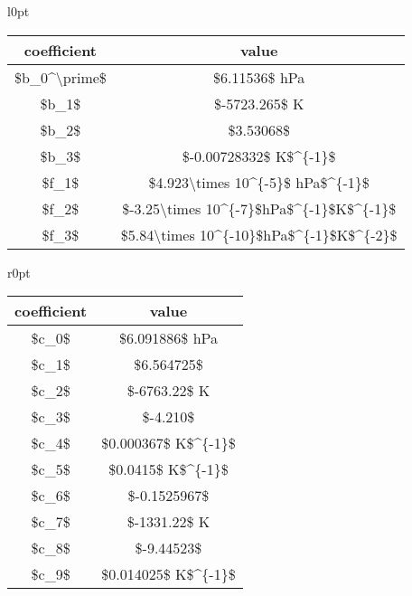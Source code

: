 \documentclass[
  english,
]{book}
\begin{document}
\begin{table}
\begin{wraptable}{l}{0pt}
\begin{tabular}[c]{c|c}
\hline
coefficient & value\\
\hline
\$b\_0\textasciicircum{}\textbackslash{}prime\$ & \$6.11536\$ hPa\\
\hline
\$b\_1\$ & \$-5723.265\$ K\\
\hline
\$b\_2\$ & \$3.53068\$\\
\hline
\$b\_3\$ & \$-0.00728332\$ K\$\textasciicircum{}\{-1\}\$\\
\hline
\$f\_1\$ & \$4.923\textbackslash{}times 10\textasciicircum{}\{-5\}\$ hPa\$\textasciicircum{}\{-1\}\$\\
\hline
\$f\_2\$ & \$-3.25\textbackslash{}times 10\textasciicircum{}\{-7\}\$hPa\$\textasciicircum{}\{-1\}\$K\$\textasciicircum{}\{-1\}\$\\
\hline
\$f\_3\$ & \$5.84\textbackslash{}times 10\textasciicircum{}\{-10\}\$hPa\$\textasciicircum{}\{-1\}\$K\$\textasciicircum{}\{-2\}\$\\
\hline
\end{tabular}\end{wraptable}\begin{wraptable}{r}{0pt}
\begin{tabular}[c]{c|c}
\hline
coefficient & value\\
\hline
\$c\_0\$ & \$6.091886\$ hPa\\
\hline
\$c\_1\$ & \$6.564725\$\\
\hline
\$c\_2\$ & \$-6763.22\$ K\\
\hline
\$c\_3\$ & \$-4.210\$\\
\hline
\$c\_4\$ & \$0.000367\$ K\$\textasciicircum{}\{-1\}\$\\
\hline
\$c\_5\$ & \$0.0415\$ K\$\textasciicircum{}\{-1\}\$\\
\hline
\$c\_6\$ & \$-0.1525967\$\\
\hline
\$c\_7\$ & \$-1331.22\$ K\\
\hline
\$c\_8\$ & \$-9.44523\$\\
\hline
\$c\_9\$ & \$0.014025\$ K\$\textasciicircum{}\{-1\}\$\\
\hline
\end{tabular}\end{wraptable}
\end{table}
\end{document}
